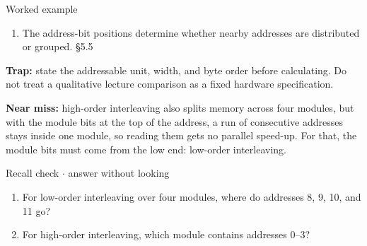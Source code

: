 \documentclass[11pt]{article}
\begin{document}
\begin{keepsection}
\begin{workedbox}{Worked example}
\begin{enumerate}
\item The address-bit positions determine whether nearby addresses are distributed or grouped. \hfill{\small\color{FAUblue}§5.5}
\end{enumerate}
\end{workedbox}

\begin{notebox}\textbf{Trap:} state the addressable unit, width, and byte order before calculating. Do not treat a qualitative lecture comparison as a fixed hardware specification.\end{notebox}

\begin{notebox}\textbf{Near miss:} high-order interleaving also splits memory across four modules, but with the module bits at the top of the address, a run of consecutive addresses stays inside one module, so reading them gets no parallel speed-up. For that, the module bits must come from the low end: low-order interleaving.\end{notebox}

\begin{recallbox}{Recall check \ensuremath{\cdot} answer without looking}
\begin{enumerate}
\item For low-order interleaving over four modules, where do addresses 8, 9, 10, and 11 go?
\item For high-order interleaving, which module contains addresses 0–3?
\end{enumerate}

\end{recallbox}
\end{keepsection}
\end{document}
